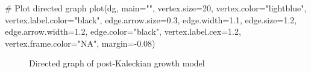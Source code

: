 \documentclass[
  letterpaper,
  DIV=11,
  numbers=noendperiod]{scrreprt}
\newenvironment{Shaded}{\begin{snugshade}}{\end{snugshade}}
\newcommand{\AttributeTok}[1]{\textcolor[rgb]{0.40,0.45,0.13}{#1}}
\newcommand{\CommentTok}[1]{\textcolor[rgb]{0.37,0.37,0.37}{#1}}
\newcommand{\DecValTok}[1]{\textcolor[rgb]{0.68,0.00,0.00}{#1}}
\newcommand{\FloatTok}[1]{\textcolor[rgb]{0.68,0.00,0.00}{#1}}
\newcommand{\FunctionTok}[1]{\textcolor[rgb]{0.28,0.35,0.67}{#1}}
\newcommand{\NormalTok}[1]{\textcolor[rgb]{0.00,0.23,0.31}{#1}}
\newcommand{\SpecialCharTok}[1]{\textcolor[rgb]{0.37,0.37,0.37}{#1}}
\newcommand{\StringTok}[1]{\textcolor[rgb]{0.13,0.47,0.30}{#1}}
\begin{document}
\begin{Shaded}
\begin{Highlighting}[]
\CommentTok{\# Plot directed graph}
\FunctionTok{plot}\NormalTok{(dg, }\AttributeTok{main=}\StringTok{""}\NormalTok{, }\AttributeTok{vertex.size=}\DecValTok{20}\NormalTok{, }\AttributeTok{vertex.color=}\StringTok{"lightblue"}\NormalTok{, }
     \AttributeTok{vertex.label.color=}\StringTok{"black"}\NormalTok{, }\AttributeTok{edge.arrow.size=}\FloatTok{0.3}\NormalTok{, }\AttributeTok{edge.width=}\FloatTok{1.1}\NormalTok{, }\AttributeTok{edge.size=}\FloatTok{1.2}\NormalTok{,}
     \AttributeTok{edge.arrow.width=}\FloatTok{1.2}\NormalTok{, }\AttributeTok{edge.color=}\StringTok{"black"}\NormalTok{, }\AttributeTok{vertex.label.cex=}\FloatTok{1.2}\NormalTok{, }
     \AttributeTok{vertex.frame.color=}\StringTok{"NA"}\NormalTok{, }\AttributeTok{margin=}\SpecialCharTok{{-}}\FloatTok{0.08}\NormalTok{)}
\end{Highlighting}
\end{Shaded}

\begin{figure}[H]


\caption{\label{fig-dg-pkdg}Directed graph of post-Kaleckian growth
model}

\end{figure}%
\end{document}
